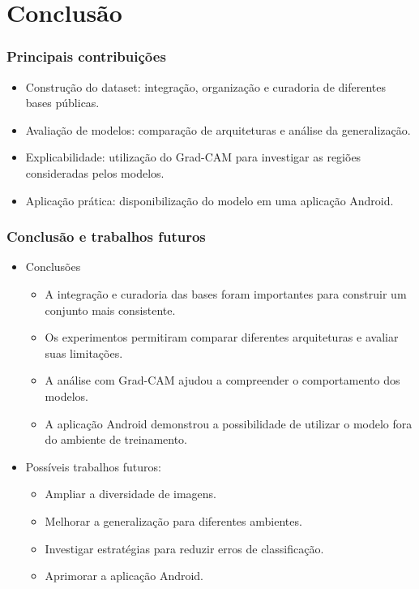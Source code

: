 \section{Conclusão}


\begin{frame}
	\frametitle{Principais contribuições}	
	\begin{itemize}
		\item Construção do dataset: integração, organização e curadoria de diferentes bases públicas.
		\item Avaliação de modelos: comparação de arquiteturas e análise da generalização.
		\item Explicabilidade: utilização do Grad-CAM para investigar as regiões consideradas pelos modelos.
		\item Aplicação prática: disponibilização do modelo em uma aplicação Android.
	\end{itemize}

\end{frame}


\begin{frame}
	
	\frametitle{Conclusão e trabalhos futuros}	
	\begin{itemize}
		
		\item Conclusões
		\begin{itemize}
			\item A integração e curadoria das bases foram importantes para construir um conjunto mais consistente.
			\item Os experimentos permitiram comparar diferentes arquiteturas e avaliar suas limitações.
			\item A análise com Grad-CAM ajudou a compreender o comportamento dos modelos.
			\item A aplicação Android demonstrou a possibilidade de utilizar o modelo fora do ambiente de treinamento.
		\end{itemize}
		
		\item Possíveis trabalhos futuros:
		\begin{itemize}
			\item Ampliar a diversidade de imagens.
			\item Melhorar a generalização para diferentes ambientes.
			\item Investigar estratégias para reduzir erros de classificação.
			\item Aprimorar a aplicação Android.		 	
		\end{itemize}
		
	\end{itemize}
	
	
\end{frame}

